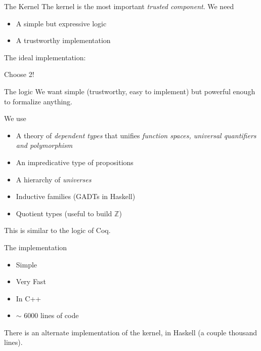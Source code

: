 \documentclass{beamer}
\newcommand{\bZ}{\mathbb{Z}}
\begin{document}
\begin{frame}{The Kernel}
  The kernel is the most important \emph{trusted component}. We need
  \begin{itemize}
  \item A simple but expressive logic
  \item A trustworthy implementation
  \end{itemize}
  The ideal implementation:

  \begin{center}
  \end{center}


  Choose 2!
\end{frame}

\begin{frame}{The logic}
  We want simple (trustworthy, easy to implement) but powerful enough
  to formalize anything.
  \begin{block}{We use}
    \begin{itemize}
    \item A theory of \emph{dependent types} that unifies \emph{function
      spaces, universal quantifiers and polymorphism}
    \item An impredicative type of propositions
    \item A hierarchy of \emph{universes}
    \item Inductive families (GADTs in Haskell)
    \item Quotient types (useful to build $\bZ$)
    \end{itemize}
  \end{block}
  This is similar to the logic of Coq.
\end{frame}

\begin{frame}{The implementation}
  \begin{itemize}
  \item Simple
  \item Very Fast
  \item In C++
  \item $\sim$ 6000 lines of code
  \end{itemize}

  There is an alternate implementation of the kernel, in Haskell (a
  couple thousand lines).
\end{frame}
\end{document}
